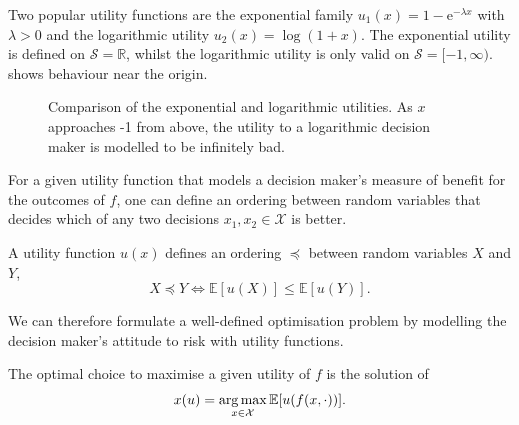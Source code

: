 \documentclass[main.tex]{subfiles}
\begin{document}
\begin{example}
  Two popular utility functions are the exponential family
  $u_1(x)=1-\mathrm{e}^{-\lambda x}$ with $\lambda>0$ and the logarithmic
  utility $u_2(x)=\log(1+x)$.
  The exponential utility is defined on $\mathcal S =\mathbb R$,
  whilst the logarithmic utility is only valid on $\mathcal
  S=[-1,\infty)$.
   shows behaviour near the origin.
  \begin{figure}[htbp]
    \centering
    \caption{Comparison of the exponential and logarithmic
      utilities. As $x$ approaches -1 from above, the utility to a logarithmic
      decision maker is modelled to be infinitely bad.
    }\label{fig:example_utilities}
  \end{figure}
\end{example}

For a given utility function that models a decision maker's measure of
benefit for the outcomes of $f$, one can define an ordering
between random variables that decides which of any two decisions
$x_1,x_2\in\mathcal{X}$ is better.
\begin{mydef}
  A utility function $u(x)$ defines an ordering $\preceq$ between random
  variables $X$ and $Y$,
  \begin{equation}
    X\preceq Y \Leftrightarrow \mathbb E[u(X)] \leq \mathbb E[u(Y)].
  \end{equation}
\end{mydef}

We can therefore formulate a well-defined optimisation problem by
modelling the decision maker's attitude to risk with utility functions.

\begin{problem}
  The optimal choice to maximise a given utility of $f$ is the
  solution of
  \begin{align}
    x(u)=\operatorname*{arg\,max}_{x\in\mathcal{X}} \mathbb E[u(f(x,\cdot))].
  \end{align}
\end{problem}
\end{document}
